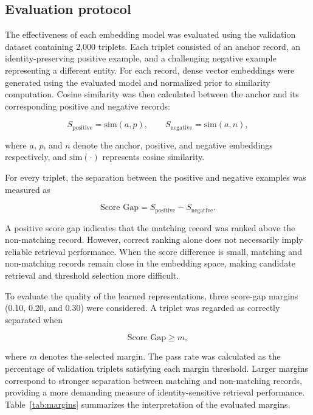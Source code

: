 \documentclass{article}
\begin{document}
\subsection{Evaluation protocol}
\label{sec:eval}

The effectiveness of each embedding model was evaluated using the validation dataset containing 2,000 triplets. Each triplet consisted of an anchor record, an identity-preserving positive example, and a challenging negative example representing a different entity. For each record, dense vector embeddings were generated using the evaluated model and normalized prior to similarity computation. Cosine similarity was then calculated between the anchor and its corresponding positive and negative records:

\begin{equation}
  S_{\text{positive}} = \mathrm{sim}(a, p), \qquad S_{\text{negative}} = \mathrm{sim}(a, n),
  \label{eq:sim}
\end{equation}

where $a$, $p$, and $n$ denote the anchor, positive, and negative embeddings respectively, and $\mathrm{sim}(\cdot)$ represents cosine similarity.

For every triplet, the separation between the positive and negative examples was measured as

\begin{equation}
  \text{Score Gap} = S_{\text{positive}} - S_{\text{negative}}.
  \label{eq:gap}
\end{equation}

A positive score gap indicates that the matching record was ranked above the non-matching record. However, correct ranking alone does not necessarily imply reliable retrieval performance. When the score difference is small, matching and non-matching records remain close in the embedding space, making candidate retrieval and threshold selection more difficult.

To evaluate the quality of the learned representations, three score-gap margins (0.10, 0.20, and 0.30) were considered. A triplet was regarded as correctly separated when

\begin{equation}
  \text{Score Gap} \geq m,
  \label{eq:margin}
\end{equation}

where $m$ denotes the selected margin. The pass rate was calculated as the percentage of validation triplets satisfying each margin threshold. Larger margins correspond to stronger separation between matching and non-matching records, providing a more demanding measure of identity-sensitive retrieval performance. Table~\ref{tab:margins} summarizes the interpretation of the evaluated margins.
\end{document}
